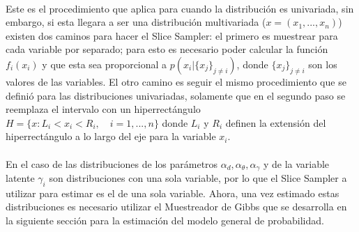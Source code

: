 \\
Este es el procedimiento que aplica para cuando la distribuci\'on es univariada, sin embargo, si esta llegara a ser una distribuci\'on multivariada ($x=(x_1,...,x_n)$) existen dos caminos para hacer el Slice Sampler: el primero es muestrear para cada variable por separado; para esto es necesario poder calcular la funci\'on $f_i(x_i)$ y que esta sea proporcional a $p(x_i|\{x_j\}_{j \neq i})$, donde $\{x_j\}_{j \neq i}$ son los valores de las variables. El otro camino es seguir el mismo procedimiento que se defini\'o para las distribuciones univariadas, solamente que en el segundo paso se reemplaza el intervalo con un hiperrect\'angulo $H=\{x:L_i<x_i<R_i, \quad i=1,...,n\}$ donde $L_i$ y $R_i$ definen la extensi\'on del hiperrect\'angulo a lo largo del eje para la variable $x_i$.\\
\\
En el caso de las distribuciones de los par\'ametros $\alpha_d,\alpha_\theta,\alpha_\gamma$ y de la variable latente $\gamma_i$ son distribuciones con una sola variable, por lo que el Slice Sampler a utilizar para estimar es el de una sola variable. Ahora, una vez estimado estas distribuciones es necesario utilizar el Muestreador de Gibbs que se desarrolla en la siguiente secci\'on para la estimaci\'on del modelo general de probabilidad.
